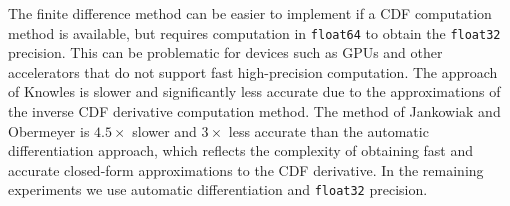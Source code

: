 \documentclass{article}
\begin{document}
The finite difference method can be easier to implement if a CDF computation method is available, but requires computation in \texttt{float64} to obtain the \texttt{float32} precision.
This can be problematic for devices such as GPUs and other accelerators that do not support fast high-precision computation.
The approach of Knowles is slower and significantly less accurate due to the approximations of the inverse CDF derivative computation method.
The method of Jankowiak and Obermeyer is $4.5\times$ slower and $3\times$ less accurate than the automatic differentiation approach, which reflects the complexity of obtaining fast and accurate closed-form approximations to the CDF derivative.
In the remaining experiments we use automatic differentiation and \texttt{float32} precision.

\begin{table}
    \centering
    \caption{Average error and time (measured in seconds per element) of the reparameterization gradient computation methods. Automatic differentiation achieves the lowest error and the highest speed.}
    \label{fig:gradient-accuracy}
\end{table} 
\end{document}
